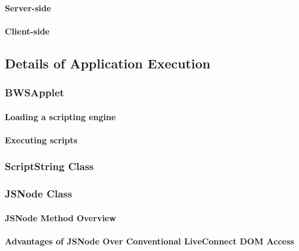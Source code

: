     \paragraph{Server-side}
    \paragraph{Client-side}
   \subsection{Details of Application Execution}
   
    
    
    \subsubsection{BWSApplet}

     
     
     \paragraph{Loading a scripting engine}
     
      
     
     \paragraph{Executing scripts}

    \subsubsection{ScriptString Class}
    
     
     
    \subsubsection{JSNode Class}
    
     
     
     \paragraph{JSNode Method Overview}
     
      
      
     \paragraph{Advantages of JSNode Over Conventional LiveConnect DOM Access}
     
